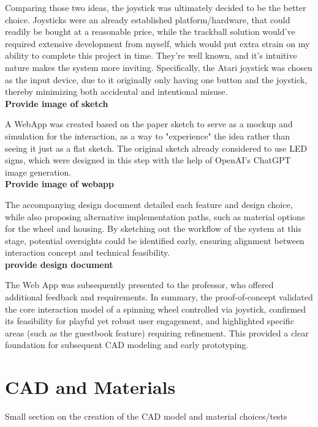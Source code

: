 Comparing those two ideas, the joystick was ultimately decided to be the better choice. Joysticks were an already established platform/hardware, that could readily be bought at a reasonable price, while the trackball solution would've required extensive development from myself, which would put extra strain on my ability to complete this project in time. They're well known, and it's intuitive nature makes the system more inviting.
Specifically, the Atari joystick was chosen as the input device, due to it originally only having one button and the joystick, thereby minimizing both accidental and intentional misuse.\\ 
\textbf{Provide image of sketch}

A WebApp was created based on the paper sketch to serve as a mockup and simulation for the interaction, as a way to "experience" the idea rather than seeing it just as a flat sketch. The original sketch already considered to use LED signs, which were designed in this step with the help of OpenAI's ChatGPT image generation.\\
\textbf{Provide image of webapp}

The accompanying design document detailed each feature and design choice, while also proposing alternative implementation paths, such as material options for the wheel and housing. By sketching out the workflow of the system at this stage, potential oversights could be identified early, ensuring alignment between interaction concept and technical feasibility.\\
\textbf{provide design document}

The Web App was subsequently presented to the professor, who offered additional feedback and requirements. 
In summary, the proof-of-concept validated the core interaction model of a spinning wheel controlled via joystick, confirmed its feasibility for playful yet robust user engagement, and highlighted specific areas (such as the guestbook feature) requiring refinement. This provided a clear foundation for subsequent CAD modeling and early prototyping.\\

\section{CAD and Materials}
Small section on the creation of the CAD model and material choices/tests
